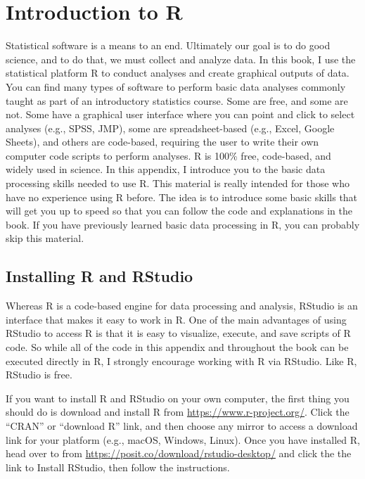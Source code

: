 \documentclass[
]{book}
\begin{document}
\section{Introduction to R}\label{introduction-to-r}

Statistical software is a means to an end. Ultimately our goal is to do good science, and to do that, we must collect and analyze data. In this book, I use the statistical platform R to conduct analyses and create graphical outputs of data. You can find many types of software to perform basic data analyses commonly taught as part of an introductory statistics course. Some are free, and some are not. Some have a graphical user interface where you can point and click to select analyses (e.g., SPSS, JMP), some are spreadsheet-based (e.g., Excel, Google Sheets), and others are code-based, requiring the user to write their own computer code scripts to perform analyses. R is 100\% free, code-based, and widely used in science. In this appendix, I introduce you to the basic data processing skills needed to use R. This material is really intended for those who have no experience using R before. The idea is to introduce some basic skills that will get you up to speed so that you can follow the code and explanations in the book. If you have previously learned basic data processing in R, you can probably skip this material.

\subsection{Installing R and RStudio}\label{installing-r-and-rstudio}

Whereas R is a code-based engine for data processing and analysis, RStudio is an interface that makes it easy to work in R. One of the main advantages of using RStudio to access R is that it is easy to visualize, execute, and save scripts of R code. So while all of the code in this appendix and throughout the book can be executed directly in R, I strongly encourage working with R via RStudio. Like R, RStudio is free.

If you want to install R and RStudio on your own computer, the first thing you should do is download and install R from \url{https://www.r-project.org/}. Click the ``CRAN'' or ``download R'' link, and then choose any mirror to access a download link for your platform (e.g., macOS, Windows, Linux). Once you have installed R, head over to from \url{https://posit.co/download/rstudio-desktop/} and click the the link to Install RStudio, then follow the instructions.
\end{document}
